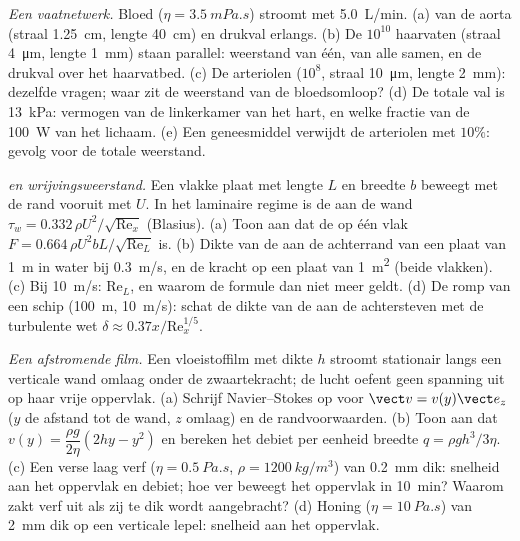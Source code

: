 \begin{exercise}[$\star\star\star$]\label{exo:b2:viscous-flows:10}
\emph{Een vaatnetwerk.} Bloed ($\eta = \qty{3.5}{mPa.s}$) stroomt met
\qty{5.0}{L/min}. (a)  van de aorta (straal
\qty{1.25}{cm}, lengte \qty{40}{cm}) en drukval erlangs. (b) De $10^{10}$
haarvaten (straal \qty{4}{\micro m}, lengte \qty{1}{mm}) staan parallel:
weerstand van één, van alle samen, en de drukval over het haarvatbed. (c) De
arteriolen ($10^8$, straal \qty{10}{\micro m}, lengte \qty{2}{mm}): dezelfde
vragen; waar zit de weerstand van de bloedsomloop? (d) De totale val is
\qty{13}{kPa}: vermogen van de linkerkamer van het hart, en welke fractie
van de \qty{100}{W} van het lichaam. (e) Een geneesmiddel verwijdt de
arteriolen met $10\%$: gevolg voor de totale weerstand.
\end{exercise}

\begin{exercise}[$\star\star\star$]\label{exo:b2:viscous-flows:11}
\emph{ en wrijvingsweerstand.} Een vlakke plaat met lengte $L$ en
breedte $b$ beweegt met de rand vooruit met $U$. In het laminaire regime is
de  aan de wand
$\tau_w = 0.332\,\rho U^2/\sqrt{\mathrm{Re}_x}$ (Blasius). (a) Toon aan dat
de  op één vlak $F = 0.664\,\rho U^2bL/\sqrt{\mathrm{Re}_L}$
is. (b) Dikte van de  aan de achterrand van een plaat van
\qty{1}{m} in water bij \qty{0.3}{m/s}, en de kracht op een plaat van
\qty{1}{m^2} (beide vlakken). (c) Bij \qty{10}{m/s}: $\mathrm{Re}_L$, en
waarom de formule dan niet meer geldt. (d) De romp van een schip
(\qty{100}{m}, \qty{10}{m/s}): schat de dikte van de  aan de
achtersteven met de turbulente wet
$\delta \approx
0.37x/\mathrm{Re}_x^{1/5}$.
\end{exercise}

\begin{exercise}[$\star\star\star$]\label{exo:b2:viscous-flows:12}
\emph{Een afstromende film.} Een vloeistoffilm met dikte $h$ stroomt
stationair langs een verticale wand omlaag onder de zwaartekracht; de lucht
oefent geen spanning uit op haar vrije oppervlak. (a) Schrijf Navier--Stokes
op voor $\vect v = v(y)\vect e_z$ ($y$ de afstand tot de wand, $z$ omlaag)
en de randvoorwaarden. (b) Toon aan dat
$v(y) = \dfrac{\rho g}{2\eta}(2hy - y^2)$ en bereken het debiet per eenheid
breedte $q = \rho gh^3/3\eta$. (c) Een verse laag verf
($\eta =
\qty{0.5}{Pa.s}$, $\rho = \qty{1200}{kg/m^3}$) van \qty{0.2}{mm}
dik: snelheid aan het oppervlak en debiet; hoe ver beweegt het oppervlak in
\qty{10}{min}? Waarom zakt verf uit als zij te dik wordt aangebracht? (d)
Honing ($\eta = \qty{10}{Pa.s}$) van \qty{2}{mm} dik op een verticale lepel:
snelheid aan het oppervlak.
\end{exercise}

